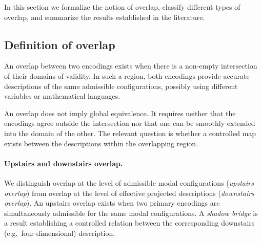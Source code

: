 \documentclass[11pt]{article}
\begin{document}
In this section we formalize the notion of overlap, classify different types of overlap, and summarize the results established in the literature.

\subsection{Definition of overlap}

An overlap between two encodings exists when there is a non-empty intersection of their domains of validity. In such a region, both encodings provide accurate descriptions of the same admissible configurations, possibly using different variables or mathematical languages.

An overlap does not imply global equivalence. It requires neither that the encodings agree outside the intersection nor that one can be smoothly extended into the domain of the other. The relevant question is whether a controlled map exists between the descriptions within the overlapping region.

\paragraph{Upstairs and downstairs overlap.}
We distinguish overlap at the level of admissible modal configurations (\emph{upstairs overlap}) from overlap at the level of
effective projected descriptions (\emph{downstairs overlap}). An upstairs overlap exists when two primary encodings are
simultaneously admissible for the same modal configurations. A \emph{shadow bridge} is a result establishing a controlled relation
between the corresponding downstairs (e.g.\ four-dimensional) description.

\begin{center}
\end{center}
\end{document}
